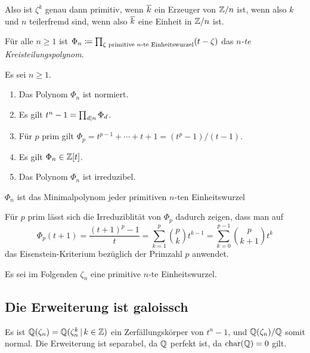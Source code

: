 Also ist $\zeta^k$ genau dann primitiv, wenn $\overline{k}$ ein Erzeuger von $\mathbb{Z}/n$ ist, wenn also $k$ und $n$ teilerfremd sind, wenn also $\overline{k}$ eine Einheit in $\mathbb{Z}/n$ ist.

\begin{definition}
  Für alle $n \geq 1$ ist $\Phi_n \coloneqq \prod_{\text{$\zeta$ primitive $n$-te Einheitswurzel}} (t - \zeta)$ das \emph{$n$-te Kreisteilungspolynom}.
\end{definition}

\begin{theorem}
  Es sei $n \geq 1$.
  \begin{enumerate}
    \item
      Das Polynom $\Phi_n$ ist normiert.
    \item
      Es gilt $t^n - 1 = \prod_{d \mathrel{|} n} \Phi_d$.
    \item
      Für $p$ prim gilt $\Phi_p = t^{p-1} + \dotsb + t + 1 = (t^p-1)/(t-1)$.
    \item
      Es gilt $\Phi_n \in \mathbb{Z}[t]$.
    \item
      Das Polynom $\Phi_n$ ist irreduzibel.
  \end{enumerate}
\end{theorem}

\begin{corollary}
  $\Phi_n$ ist das Minimalpolynom jeder primitiven $n$-ten Einheitswurzel
\end{corollary}

\begin{remark}
  Für $p$ prim lässt sich die Irreduziblität von $\Phi_p$ dadurch zeigen, dass man auf
  \[
      \Phi_p(t+1)
    = \frac{(t+1)^p - 1}{t}
    = \sum_{k=1}^p \binom{p}{k} t^{k-1}
    = \sum_{k=0}^{p-1} \binom{p}{k+1} t^k
  \]
  das Eisenstein-Kriterium bezüglich der Primzahl $p$ anwendet.
\end{remark}

Es sei im Folgenden $\zeta_n$ eine primitive $n$-te Einheitswurzel.

\subsection{Die Erweiterung ist galoissch}

Es ist $\Rational(\zeta_n) = \Rational(\zeta_n^k \suchthat k \in \Integer)$ ein Zerfällungskörper von $t^n - 1$, und $\mathbb{Q}(\zeta_n)/\mathbb{Q}$ somit normal.
Die Erweiterung ist separabel, da $\mathbb{Q}$ perfekt ist, da $\operatorname{char}(\mathbb{Q}) = 0$ gilt.

